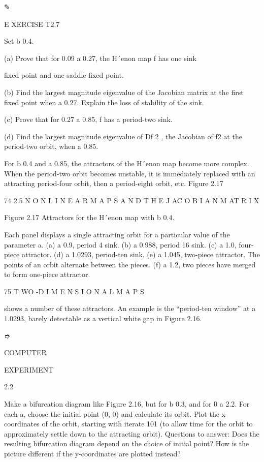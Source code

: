\documentclass[12pt]{article}
\begin{document}
✎

E XERCISE T2.7

Set b  0.4.

(a) Prove that for 0.09  a  0.27, the H´enon map f has one sink

ﬁxed point and one saddle ﬁxed point.

(b) Find the largest magnitude eigenvalue of the Jacobian matrix at the ﬁrst ﬁxed point when a  0.27. Explain the loss of stability 
of the sink.

(c) Prove that for 0.27  a  0.85, f has a period-two sink.

(d) Find the largest magnitude eigenvalue of Df 2 , the Jacobian of f2  at the period-two orbit, when a  0.85.

For b  0.4 and a  0.85, the attractors of the H´enon map become more complex. When the period-two orbit becomes unstable, it is 
immediately replaced with an attracting period-four orbit, then a period-eight orbit, etc. Figure 2.17

74 2.5 N O N L I N E A R M A P S A N D T H E J AC O B I A N M AT R I X

Figure 2.17 Attractors for the H´enon map with b  0.4.

Each panel displays a single attracting orbit for a particular value of the parameter a. (a) a  0.9, period 4 sink. (b) a  0.988, 
period 16 sink. (c) a  1.0, four-piece attractor. (d) a  1.0293, period-ten sink. (e) a  1.045, two-piece attractor. The points of an 
orbit alternate between the pieces. (f) a  1.2, two pieces have merged to form one-piece attractor.

75 T WO -D I M E N S I O N A L M A P S

shows a number of these attractors. An example is the “period-ten window” at a  1.0293, barely detectable as a vertical white gap in 
Figure 2.16.

➮

COMPUTER

EXPERIMENT

2.2

Make a bifurcation diagram like Figure 2.16, but for b  0.3, and for 0 a 2.2. For each a, choose the initial point (0, 0) and 
calculate its orbit. Plot the x-coordinates of the orbit, starting with iterate 101 (to allow time for the orbit to approximately 
settle down to the attracting orbit). Questions to answer: Does the resulting bifurcation diagram depend on the choice of initial 
point? How is the picture different if the y-coordinates are plotted instead?
\end{document}
